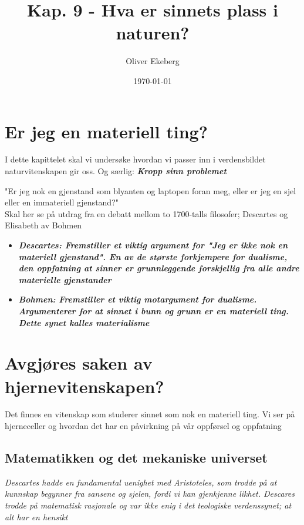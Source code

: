 \documentclass[11pt, a4paper]{article}
\title{Kap. 9 - Hva er sinnets plass i naturen?}
\author{Oliver Ekeberg}
\date{\today}
\begin{document}
\maketitle

\tableofcontents


\section{Er jeg en materiell ting?}

I dette kapittelet skal vi undersøke hvordan vi passer inn i verdensbildet naturvitenskapen gir oss. Og særlig: \textbf{\textit{Kropp sinn problemet}}


"Er jeg nok en gjenstand som blyanten og laptopen foran meg, eller er jeg en sjel eller en immateriell gjenstand?"\\

Skal her se på utdrag fra en debatt mellom to 1700-talls filosofer; Descartes og Elisabeth av Bohmen


\begin{itemize}
    \item \textbf{\textit{Descartes: Fremstiller et viktig argument for "Jeg er ikke nok en materiell gjenstand". En av de største forkjempere for dualisme, den oppfatning at sinner er grunnleggende forskjellig fra alle andre materielle gjenstander}}
    \item \textbf{\textit{Bohmen: Fremstiller et viktig motargument for dualisme. Argumenterer for at sinnet i bunn og grunn er en materiell ting. Dette synet kalles materialisme}}
\end{itemize}


\section{Avgjøres saken av hjernevitenskapen?}


Det finnes en vitenskap som studerer sinnet som nok en materiell ting. Vi ser på hjerneceller og hvordan det har en påvirkning på vår oppførsel og oppfatning

\subsection{Matematikken og det mekaniske universet}

\textit{Descartes hadde en fundamental uenighet med Aristoteles, som trodde på at kunnskap begynner fra sansene og sjelen, fordi vi kan gjenkjenne likhet. Descares trodde på matematisk rasjonale og var ikke enig i det teologiske verdenssynet; at alt har en hensikt}
\end{document}
